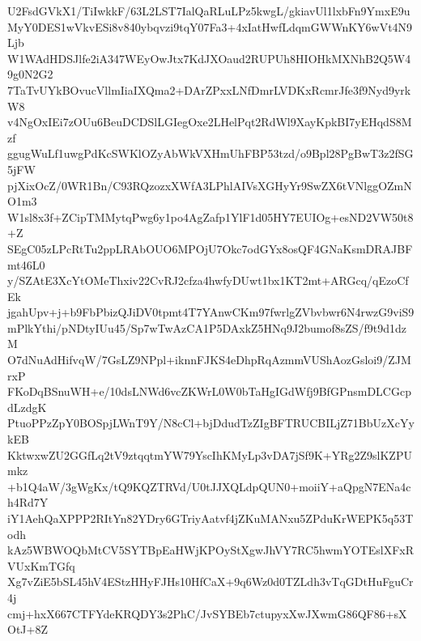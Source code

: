 U2FsdGVkX1/TiIwkkF/63L2LST7IalQaRLuLPz5kwgL/gkiavUl1lxbFn9YmxE9u
MyY0DES1wVkvESi8v840ybqvzi9tqY07Fa3+4xIatHwfLdqmGWWnKY6wVt4N9Ljb
W1WAdHDSJlfe2iA347WEyOwJtx7KdJXOaud2RUPUh8HIOHkMXNhB2Q5W49g0N2G2
7TaTvUYkBOvucVllmIiaIXQma2+DArZPxxLNfDmrLVDKxRcmrJfe3f9Nyd9yrkW8
v4NgOxIEi7zOUu6BeuDCDSlLGIegOxe2LHelPqt2RdWl9XayKpkBI7yEHqdS8Mzf
ggugWuLf1uwgPdKcSWKlOZyAbWkVXHmUhFBP53tzd/o9Bpl28PgBwT3z2fSG5jFW
pjXixOcZ/0WR1Bn/C93RQzozxXWfA3LPhlAIVsXGHyYr9SwZX6tVNlggOZmNO1m3
W1sl8x3f+ZCipTMMytqPwg6y1po4AgZafp1YlF1d05HY7EUIOg+esND2VW50t8+Z
SEgC05zLPcRtTu2ppLRAbOUO6MPOjU7Okc7odGYx8osQF4GNaKsmDRAJBFmt46L0
y/SZAtE3XcYtOMeThxiv22CvRJ2cfza4hwfyDUwt1bx1KT2mt+ARGcq/qEzoCfEk
jgahUpv+j+b9FbPbizQJiDV0tpmt4T7YAnwCKm97fwrlgZVbvbwr6N4rwzG9viS9
mPlkYthi/pNDtyIUu45/Sp7wTwAzCA1P5DAxkZ5HNq9J2bumof8sZS/f9t9d1dzM
O7dNuAdHifvqW/7GsLZ9NPpl+iknnFJKS4eDhpRqAzmmVUShAozGsloi9/ZJMrxP
FKoDqBSnuWH+e/10dsLNWd6vcZKWrL0W0bTaHgIGdWfj9BfGPnsmDLCGcpdLzdgK
PtuoPPzZpY0BOSpjLWnT9Y/N8cCl+bjDdudTzZIgBFTRUCBILjZ71BbUzXcYykEB
KktwxwZU2GGfLq2tV9ztqqtmYW79YscIhKMyLp3vDA7jSf9K+YRg2Z9slKZPUmkz
+b1Q4aW/3gWgKx/tQ9KQZTRVd/U0tJJXQLdpQUN0+moiiY+aQpgN7ENa4ch4Rd7Y
iY1AehQaXPPP2RItYn82YDry6GTriyAatvf4jZKuMANxu5ZPduKrWEPK5q53Todh
kAz5WBWOQbMtCV5SYTBpEaHWjKPOyStXgwJhVY7RC5hwmYOTEslXFxRVUxKmTGfq
Xg7vZiE5bSL45hV4EStzHHyFJHs10HfCaX+9q6Wz0d0TZLdh3vTqGDtHuFguCr4j
cmj+hxX667CTFYdeKRQDY3s2PhC/JvSYBEb7ctupyxXwJXwmG86QF86+sXOtJ+8Z
